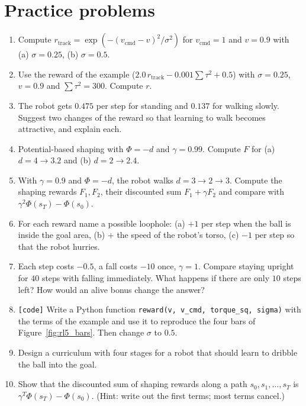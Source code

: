 \section*{Practice problems}
\begin{enumerate}[label=\textbf{\thechapter.\arabic*}]
  \item Compute $r_{\text{track}}=\exp(-(v_{\text{cmd}}-v)^2/\sigma^2)$ for $v_{\text{cmd}}=1$ and $v=0.9$ with (a) $\sigma=0.25$, (b) $\sigma=0.5$.
  \item Use the reward of the example ($2.0\,r_{\text{track}}-0.001\sum\tau^2+0.5$) with $\sigma=0.25$, $v=0.9$ and $\sum\tau^2=300$. Compute $r$.
  \item The robot gets $0.475$ per step for standing and $0.137$ for walking slowly. Suggest two changes of the reward so that learning to walk becomes attractive, and explain each.
  \item Potential-based shaping with $\Phi=-d$ and $\gamma=0.99$. Compute $F$ for (a) $d=4\to3.2$ and (b) $d=2\to2.4$.
  \item With $\gamma=0.9$ and $\Phi=-d$, the robot walks $d=3\to2\to3$. Compute the shaping rewards $F_1,F_2$, their discounted sum $F_1+\gamma F_2$ and compare with $\gamma^2\Phi(s_T)-\Phi(s_0)$.
  \item For each reward name a possible loophole: (a) $+1$ per step when the ball is inside the goal area, (b) $+$ the speed of the robot's torso, (c) $-1$ per step so that the robot hurries.
  \item Each step costs $-0.5$, a fall costs $-10$ once, $\gamma=1$. Compare staying upright for $40$ steps with falling immediately. What happens if there are only $10$ steps left? How would an alive bonus change the answer?
  \item[\textbf{\thechapter.8}] \texttt{[code]} Write a Python function \texttt{reward(v, v\_cmd, torque\_sq, sigma)} with the terms of the example and use it to reproduce the four bars of Figure~\ref{fig:rl5_bars}. Then change $\sigma$ to $0.5$.
  \item Design a curriculum with four stages for a robot that should learn to dribble the ball into the goal.
  \item[\textbf{\thechapter.10}$\star$] Show that the discounted sum of shaping rewards along a path $s_0,s_1,\dots,s_T$ is $\gamma^T\Phi(s_T)-\Phi(s_0)$. (Hint: write out the first terms; most terms cancel.)
\end{enumerate}
